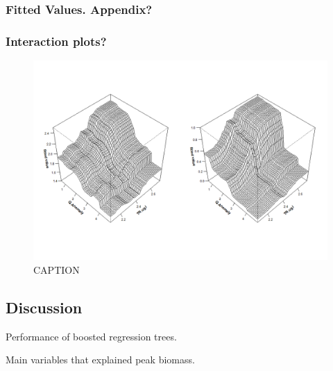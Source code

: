 \documentclass[
]{article}
\begin{document}
\hypertarget{fitted-values.-appendix}{%
\subsubsection{Fitted Values. Appendix?}\label{fitted-values.-appendix}}

\hypertarget{interaction-plots}{%
\subsubsection{Interaction plots?}\label{interaction-plots}}

\begin{figure}
\centering
\includegraphics{Manuscript_files/FIGURES/Interaction_Plots.png}
\caption{CAPTION}
\end{figure}

\hypertarget{discussion}{%
\subsection{Discussion}\label{discussion}}

Performance of boosted regression trees.

Main variables that explained peak biomass.
\end{document}
